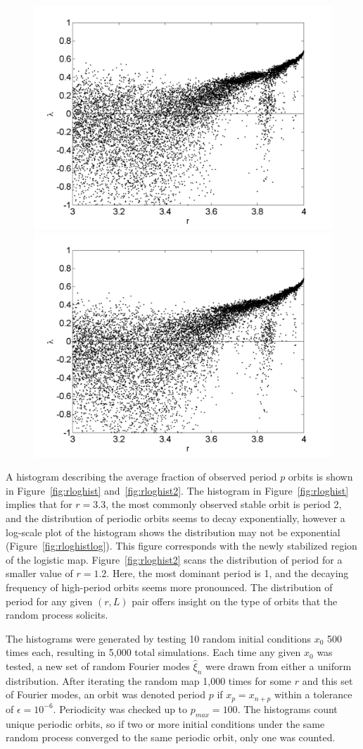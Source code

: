 \begin{figure}[!h]
\includegraphics[width=.5\textwidth]{figs/rlog_lyap_halfsig_L_08.png}\hfill
\includegraphics[width=.5\textwidth]{figs/rlog_lyap_halfsig_L_09.png}\\
\end{figure}

A histogram describing the average fraction of observed period $p$
orbits is shown in Figure~\ref{fig:rloghist}
and~\ref{fig:rloghist2}. The histogram in Figure~\ref{fig:rloghist} implies
that for $r=3.3$, the most commonly observed stable orbit is period 2, and the
distribution of periodic orbits seems to decay exponentially, however
a log-scale plot of the histogram shows the distribution may not be
exponential (Figure~\ref{fig:rloghistlog}). This figure corresponds with the newly stabilized region
of the logistic map. Figure~\ref{fig:rloghist2} scans the distribution
of period for a smaller value of $r=1.2$. Here, the most dominant
period is 1, and the decaying frequency of high-period orbits seems
more pronounced. The distribution of period for any given $(r,L)$ pair
offers insight on the type of orbits that the random process solicits.

The histograms were generated by testing 10 random initial conditions $x_0$ 500 times
each, resulting in 5,000 total simulations. Each time any given $x_0$
was tested, a new set of random Fourier modes $\hat{\xi}_n$ were drawn
from either a uniform distribution. After iterating the random
map 1,000 times for some $r$ and this set of Fourier modes, an orbit was denoted period $p$ if $x_p = x_{n+p}$ within a
tolerance of $\epsilon = 10^{-6}$. Periodicity was checked up to
$p_{max}=100$. The histograms count unique periodic orbits, so if two
or more initial conditions under the same random process converged to the same periodic orbit, only
one was counted. 

